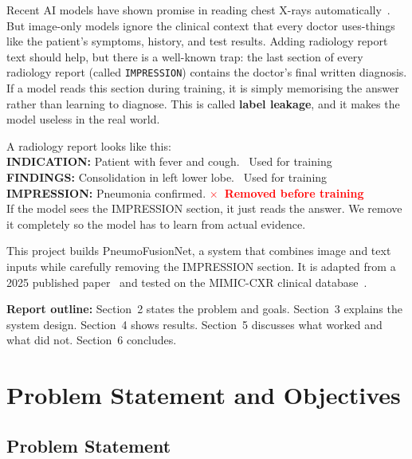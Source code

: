 \documentclass{article}
\begin{document}
Recent AI models have shown promise in reading chest X-rays
automatically~\cite{rajpurkar2017chexnet}. But image-only models ignore the
clinical context that every doctor uses-things like the patient's symptoms,
history, and test results. Adding radiology report text should help, but there
is a well-known trap: the last section of every radiology report (called
\texttt{IMPRESSION}) contains the doctor's final written diagnosis. If a model
reads this section during training, it is simply memorising the answer rather
than learning to diagnose. This is called \textbf{label leakage}, and it makes
the model useless in the real world.

\begin{tcolorbox}[colback=red!4!white, colframe=red!60!black,
                  title=What is Label Leakage?, fonttitle=\small\bfseries]
\small
A radiology report looks like this:\\[4pt]
\textbf{INDICATION:} Patient with fever and cough.
  \textcolor{successgrn}{\checkmark\ Used for training}\\
\textbf{FINDINGS:} Consolidation in left lower lobe.
  \textcolor{successgrn}{\checkmark\ Used for training}\\
\textbf{IMPRESSION:} Pneumonia confirmed.
  \textcolor{red}{\textbf{$\times$\ Removed before training}}\\[4pt]
If the model sees the IMPRESSION section, it just reads the answer.
We remove it completely so the model has to learn from actual evidence.
\end{tcolorbox}

This project builds PneumoFusionNet, a system that combines image and text
inputs while carefully removing the IMPRESSION section. It is adapted from a
2025 published paper~\cite{frontiers2025pneumofusion} and tested on the
MIMIC-CXR clinical database~\cite{johnson2019mimic}.

\textbf{Report outline:} Section~2 states the problem and goals. Section~3
explains the system design. Section~4 shows results. Section~5 discusses
what worked and what did not. Section~6 concludes.

\section{Problem Statement and Objectives}

\subsection{Problem Statement}
\end{document}
